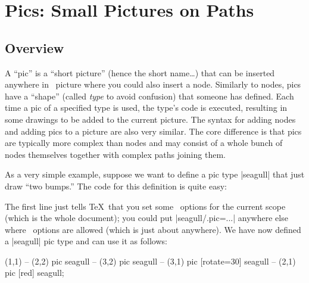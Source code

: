 %
%
%

\section{Pics: Small Pictures on Paths}

\label{section-pics}

\subsection{Overview}

A ``pic'' is a ``short picture'' (hence the short name\dots) that can
be inserted anywhere in \tikzname\ picture where you could also insert
a node. Similarly to nodes, pics have a ``shape'' (called \emph{type}
to avoid confusion) that someone has defined. Each time a pic of a
specified type is used, the type's code is executed, resulting in some
drawings to be added to the current picture. The syntax for adding
nodes and adding pics to a picture are also very similar. The core
difference is that pics are typically more complex than nodes and may
consist of a whole bunch of nodes themselves together with complex
paths joining them.

As a very simple example, suppose we want to define a pic type
|seagull| that just draw ``two bumps.'' The code for this definition
is quite easy:
\begin{codeexample}
\end{codeexample}

The first line just tells \TeX\ that you set some \tikzname\ options
for the current scope (which is the whole document); you could put
|seagull/.pic=...| anywhere else where \tikzname\ options are allowed
(which is just about anywhere). We have now defined a |seagull| pic
type and can use it as follows:

\begin{codeexample}[]
\tikz \fill [fill=blue!20]
     (1,1)
  -- (2,2) pic             {seagull}
  -- (3,2) pic             {seagull}
  -- (3,1) pic [rotate=30] {seagull}
  -- (2,1) pic [red]       {seagull};
\end{codeexample}

